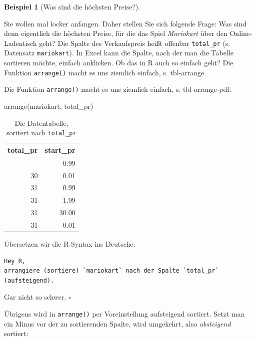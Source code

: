 \documentclass[
  letterpaper,
]{scrbook}
\newenvironment{Shaded}{\begin{snugshade}}{\end{snugshade}}
\newcommand{\FunctionTok}[1]{\textcolor[rgb]{0.28,0.35,0.67}{#1}}
\newcommand{\NormalTok}[1]{\textcolor[rgb]{0.00,0.23,0.31}{#1}}
\theoremstyle{definition}
\theoremstyle{definition}
\newtheorem{example}{Beispiel}[chapter]
\theoremstyle{definition}
\theoremstyle{remark}
\begin{document}
\begin{example}[Was sind die höchsten
Preise?]\protect\hypertarget{exm-arrange1}{}\label{exm-arrange1}

Sie wollen mal locker anfangen. Daher stellen Sie sich folgende Frage:
Was sind denn eigentlich die höchsten Preise, für die das Spiel
\emph{Mariokart} über den Online-Ladentisch geht? Die Spalte des
Verkaufspreis heißt offenbar \texttt{total\_pr} (s. Datensatz
\texttt{mariokart}). In Excel kann die Spalte, nach der man die Tabelle
sortieren möchte, einfach anklicken. Ob das in R auch so einfach geht?
Die Funktion \texttt{arrange()} macht es uns ziemlich einfach, s.
tbl-arrange.

Die Funktion \texttt{arrange()} macht es uns ziemlich einfach, s.
tbl-arrange-pdf.

\begin{Shaded}
\begin{Highlighting}[]
\FunctionTok{arrange}\NormalTok{(mariokart, total\_pr) }
\end{Highlighting}
\end{Shaded}

\begin{longtable}[]{@{}rr@{}}

\caption{\label{tbl-arrange-pdf}Die Datentabelle, soritert nach
\texttt{total\_pr}}

\tabularnewline

\toprule\noalign{}
total\_pr & start\_pr \\
\midrule\noalign{}
\endhead
\bottomrule\noalign{}
\endlastfoot
29 & 0.99 \\
30 & 0.01 \\
31 & 0.99 \\
31 & 1.99 \\
31 & 30.00 \\
31 & 0.01 \\

\end{longtable}

Übersetzen wir die R-Syntax ins Deutsche:

\begin{verbatim}
Hey R,
arrangiere (sortiere) `mariokart` nach der Spalte `total_pr` (aufsteigend).
\end{verbatim}

Gar nicht so schwer. \(\square\)

\end{example}

Übrigens wird in \texttt{arrange()} per Voreinstellung aufsteigend
sortiert. Setzt man ein Minus vor der zu sortierenden Spalte, wird
umgekehrt, also \emph{absteigend} sortiert:
\end{document}
